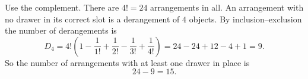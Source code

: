 Use the complement. There are $4!=24$ arrangements in all. An arrangement with no drawer in its correct slot is a derangement of $4$ objects. By inclusion--exclusion the number of derangements is
\[D_4=4!\left(1-\dfrac{1}{1!}+\dfrac{1}{2!}-\dfrac{1}{3!}+\dfrac{1}{4!}\right)=24-24+12-4+1=9.\]
So the number of arrangements with at least one drawer in place is
\[24-9=\boxed{15}.\]
